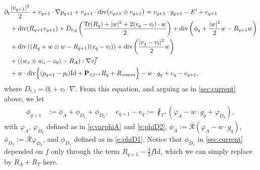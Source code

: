 \documentclass[10pt,a4paper]{amsart}
\numberwithin{equation}{section}
\numberwithin{corollario}{section}
\numberwithin{lemma}{section}
\numberwithin{prop}{section}
\theoremstyle{definition}
\theoremstyle{remark}
\newcommand{\T}{\mathbb{T}}
\renewcommand{\P}{\mathbf{P}}
\newcommand{\dvg}{\mathord{{\rm div}}}
\newcommand{\Id}{\mathrm{Id}}
\DeclareMathOperator{\Tr}{Tr}
\newcommand{\qq}{_{q+1}}
\begin{document}
    \begin{align}\label{eq:LEI.forced.iteration}
        \partial_t&\frac{|v\qq|^2}{2}
        +
        v\qq\cdot \nabla p\qq
        +
        v\qq \cdot\dvg\big(v\qq\otimes v\qq\big) 
        =
        v_{q+1} \cdot g\qq  -E' +e\qq 
        \\
        &+\dvg(R\qq v\qq)
        +D_{t,q}\left(\frac{\Tr(R_q)+|w|^2+2(v_q-v_l)\cdot w}{2}\right)+\dvg\left(\phi_q+\frac{|w|^2}{2}w-R\qq w\right)
        \\
        &+\dvg\left((R_q+w \otimes w -R\qq)(v_q-v_l)  
    \right)
    +
    \dvg\left(\frac{|v_q-v_l|^2}{2}w\right)
        \\
        &+\left((w_o \otimes w_o-c_0)-R_A\right):\nabla v_l^T
        \\
        &+
        w\cdot\dvg\Big\{(p\qq-p_l)\Id+\P_{\leq l^{-1}}R_q
        +
        R_{comm} \Big\}
        -w \cdot g_q +e_q -e\qq,
    \end{align} 
    where $D_{t,l}=\partial_t+v_l\cdot \nabla$.
From this equation, and arguing as in \autoref{sec:current} above, we let
\begin{align}
    \phi\qq &:= \phi_A + \phi_{D_1}+ \phi_{D_2},
    \quad
    e\qq - e_q := \fint_{\T^3} \left( \varphi_A -w \cdot g_q +\varphi_{D_2}  \right),
\end{align}
with $\varphi_A$, $\varphi_{D_2}$ defined as in \eqref{e:varphiA} and \eqref{e:phiD2}, $\phi_A:= \overline{\mathcal{R}}(\varphi_A-w\cdot g_q)$, $\phi_{D_2} :=  \overline{\mathcal{R}}\varphi_{D_2}$, and $\phi_{D_1}$ defined as in \eqref{e:phiD1}.
Notice that $\phi_{D_1}$ in \autoref{sec:current} depended on $f$ only through the term $R\qq - \frac32 f \Id$, which we can simply replace by $R_A+R_T$ here.
\end{document}
